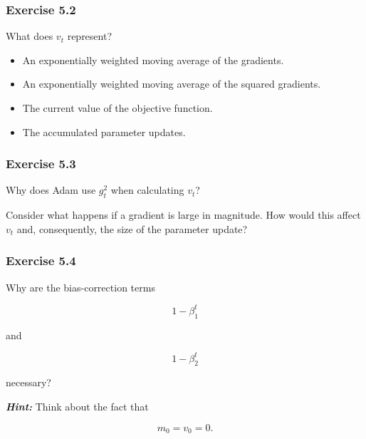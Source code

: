 \documentclass{course_sheet}
\begin{document}
\subsubsection*{Exercise 5.2}
What does $v_t$ represent?

\begin{itemize}
\item
[ ] An exponentially weighted moving average of the gradients.

\item
[ ] An exponentially weighted moving average of the squared gradients.

\item
[ ] The current value of the objective function.

\item
[ ] The accumulated parameter updates.

\end{itemize}
\subsubsection*{Exercise 5.3}
Why does Adam use $g_t^2$ when calculating $v_t$?

Consider what happens if a gradient is large in magnitude. How would this affect $v_t$ and, consequently, the size of the parameter update?

\subsubsection*{Exercise 5.4}
Why are the bias-correction terms

\[
1-\beta_1^t
\]

and

\[
1-\beta_2^t
\]

necessary?

\textbf{\textit{Hint:}} Think about the fact that

\[
m_0=v_0=0.
\]
\end{document}
